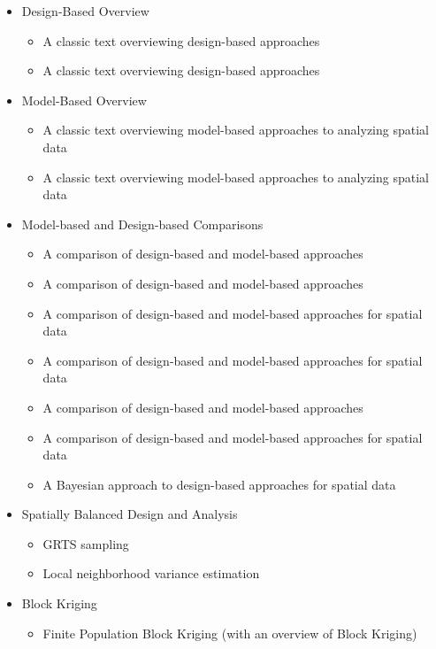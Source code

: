 \begin{itemize}
  \item Design-Based Overview
    \begin{itemize}
      \item A classic text overviewing design-based approaches \citep{Sarndal2003model}
      \item A classic text overviewing design-based approaches \citep{Lohr2009sampling}
    \end{itemize}
  \item Model-Based Overview
    \begin{itemize}
      \item A classic text overviewing model-based approaches to analyzing spatial data \citep{Cressie2015statistics}
      \item A classic text overviewing model-based approaches to analyzing spatial data \citep{Schabenberger2017statistical}
    \end{itemize}
  \item Model-based and Design-based Comparisons
      \begin{itemize}
        \item A comparison of design-based and model-based approaches \citep{Hansen1983evaluation}
        \item A comparison of design-based and model-based approaches \citep{Brus1997random}
        \item A comparison of design-based and model-based approaches for spatial data \citep{VerHoef2002sampling}
        \item A comparison of design-based and model-based approaches for spatial data \citep{Cooper2006sampling}
        \item A comparison of design-based and model-based approaches\citep{sterba2009alternative}
        \item A comparison of design-based and model-based approaches for spatial data \citep{Brus2020statistical}
        \item A Bayesian approach to design-based approaches for spatial data \citep{Chan2020bayesian}
      \end{itemize}
  \item Spatially Balanced Design and Analysis
      \begin{itemize}
        \item GRTS sampling \citep{StevensOlsen2004GRTS}
        \item Local neighborhood variance estimation \citep{StevensOlsen2003VarianceEstimation}
      \end{itemize}
  \item Block Kriging 
      \begin{itemize}
        \item Finite Population Block Kriging (with an overview of Block Kriging) \citep{VerHoef2008spatial}
      \end{itemize}
\end{itemize}


